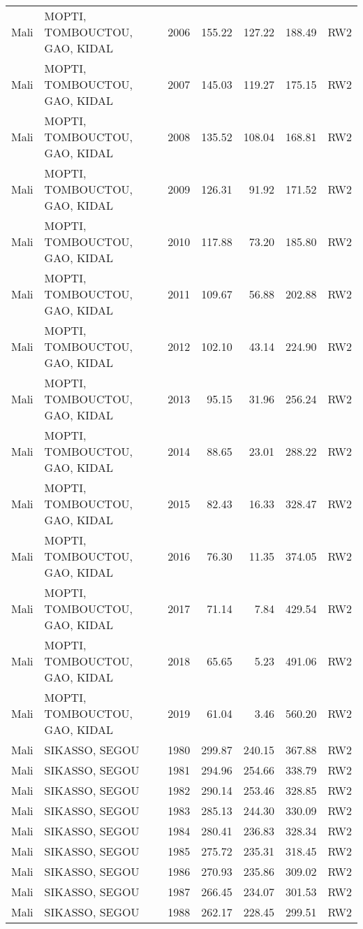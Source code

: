 \begin{longtable}{lllrrrl}
  Mali & MOPTI, TOMBOUCTOU, GAO, KIDAL & 2006 & 155.22 & 127.22 & 188.49 & RW2 \\ 
  Mali & MOPTI, TOMBOUCTOU, GAO, KIDAL & 2007 & 145.03 & 119.27 & 175.15 & RW2 \\ 
  Mali & MOPTI, TOMBOUCTOU, GAO, KIDAL & 2008 & 135.52 & 108.04 & 168.81 & RW2 \\ 
  Mali & MOPTI, TOMBOUCTOU, GAO, KIDAL & 2009 & 126.31 & 91.92 & 171.52 & RW2 \\ 
  Mali & MOPTI, TOMBOUCTOU, GAO, KIDAL & 2010 & 117.88 & 73.20 & 185.80 & RW2 \\ 
  Mali & MOPTI, TOMBOUCTOU, GAO, KIDAL & 2011 & 109.67 & 56.88 & 202.88 & RW2 \\ 
  Mali & MOPTI, TOMBOUCTOU, GAO, KIDAL & 2012 & 102.10 & 43.14 & 224.90 & RW2 \\ 
  Mali & MOPTI, TOMBOUCTOU, GAO, KIDAL & 2013 & 95.15 & 31.96 & 256.24 & RW2 \\ 
  Mali & MOPTI, TOMBOUCTOU, GAO, KIDAL & 2014 & 88.65 & 23.01 & 288.22 & RW2 \\ 
  Mali & MOPTI, TOMBOUCTOU, GAO, KIDAL & 2015 & 82.43 & 16.33 & 328.47 & RW2 \\ 
  Mali & MOPTI, TOMBOUCTOU, GAO, KIDAL & 2016 & 76.30 & 11.35 & 374.05 & RW2 \\ 
  Mali & MOPTI, TOMBOUCTOU, GAO, KIDAL & 2017 & 71.14 & 7.84 & 429.54 & RW2 \\ 
  Mali & MOPTI, TOMBOUCTOU, GAO, KIDAL & 2018 & 65.65 & 5.23 & 491.06 & RW2 \\ 
  Mali & MOPTI, TOMBOUCTOU, GAO, KIDAL & 2019 & 61.04 & 3.46 & 560.20 & RW2 \\ 
  Mali & SIKASSO, SEGOU & 1980 & 299.87 & 240.15 & 367.88 & RW2 \\ 
  Mali & SIKASSO, SEGOU & 1981 & 294.96 & 254.66 & 338.79 & RW2 \\ 
  Mali & SIKASSO, SEGOU & 1982 & 290.14 & 253.46 & 328.85 & RW2 \\ 
  Mali & SIKASSO, SEGOU & 1983 & 285.13 & 244.30 & 330.09 & RW2 \\ 
  Mali & SIKASSO, SEGOU & 1984 & 280.41 & 236.83 & 328.34 & RW2 \\ 
  Mali & SIKASSO, SEGOU & 1985 & 275.72 & 235.31 & 318.45 & RW2 \\ 
  Mali & SIKASSO, SEGOU & 1986 & 270.93 & 235.86 & 309.02 & RW2 \\ 
  Mali & SIKASSO, SEGOU & 1987 & 266.45 & 234.07 & 301.53 & RW2 \\ 
  Mali & SIKASSO, SEGOU & 1988 & 262.17 & 228.45 & 299.51 & RW2 \\ 

\end{longtable}
